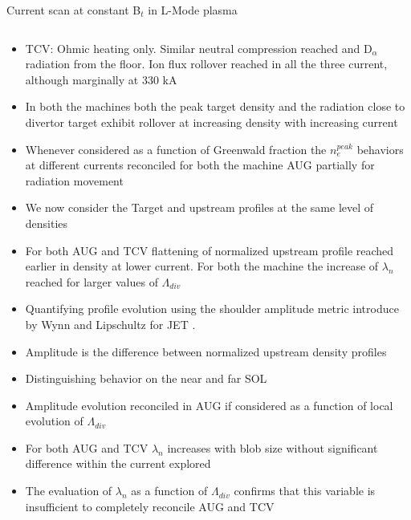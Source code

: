 \documentclass[10pt, compress]{beamer}
\begin{document}
\begin{frame}{Current scan at constant B$_t$ in L-Mode plasma}
\begin{columns}
\begin{column}{0.3\textwidth}
\begin{itemize}
          avoid earlier disruption. Comparable neutral pressure in the
          subdivertor region reached. 0.5 MW NBI additional power added to
          keep power in the SOL approximately constant
        \item<3|only@3> TCV: Ohmic heating only. Similar neutral compression reached and
          D$_{\alpha}$ radiation from the floor. Ion flux rollover
          reached in all the three current,  although marginally at
          330 kA
        \item<4|only@4> In both the machines both the peak target
          density and the radiation close to divertor target exhibit
          rollover at increasing density with increasing current
        \item<5|only@5> Whenever considered as a function of
          Greenwald fraction the $n_e^{peak}$ behaviors at different currents
          reconciled for both the machine AUG \alert{partially for
            radiation movement}
        \item<only@6-7> We now consider the Target and upstream
          profiles at the same level of densities  
        \item<only@7> For both AUG and TCV flattening of normalized
          upstream profile reached \alert{earlier in density at lower
            current.} For both the machine the increase of $\lambda_n$
          reached for larger values of $\Lambda_{div}$
        \item<only@8> Quantifying profile evolution using the
          \alert{shoulder amplitude metric} introduce by Wynn and
          Lipschultz for JET \parencite{Wynn:2018gp}.
        \item<only@8>  \alert{Amplitude is the difference
            between normalized upstream density profiles}
        \item<only@8> Distinguishing behavior on the near and far SOL  
        \item<only@11> Amplitude evolution reconciled in AUG if
          considered as a function of local evolution of $\Lambda_{div}$
        \item<only@12> For both AUG and TCV $\lambda_n$ increases
          with blob size without significant difference within the
          current explored
        \item<only@13> \alert{The evaluation of $\lambda_n$ as a
          function of $\Lambda_{div}$ confirms that this variable is
          insufficient to completely reconcile AUG and TCV}
      \end{itemize}
    \end{column}
  \end{columns}
\end{frame}  
\end{document}
